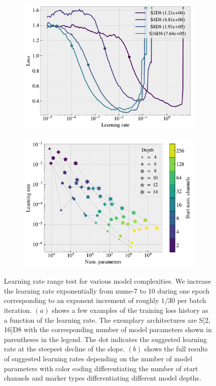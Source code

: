 \begin{figure}[H]
  \centering
  \begin{subfigure}[t]{0.49\textwidth}
      \centering
      \includegraphics[width=\textwidth]{figures/ML/LR_range_specific.pdf}
      \caption{}
  \end{subfigure}
  \hfill
  \begin{subfigure}[t]{0.49\textwidth}
      \centering
      \includegraphics[width=\textwidth]{figures/ML/LR_range_full.pdf}
      \caption{}
  \end{subfigure}
  \hfill
  \caption{Learning rate range test for various model complexities. We increase the learning rate exponentially from num{e-7} to 10 during one epoch corresponding to an exponent increment of roughly $1/30$ per batch iteration. $(a)$ shows a few examples of the training loss history as a function of the learning rate. The exemplary architectures are S[2, 16]D8 with the corresponding number of model parameters shown in parentheses in the legend. The dot indicates the suggested learning rate at the steepest decline of the slope. $(b)$ shows the full results of suggested learning rates depending on the number of model parameters with color coding differentiating the number of start channels and marker types differentiating different model depths. }
  \label{fig:LR_range}
\end{figure}
